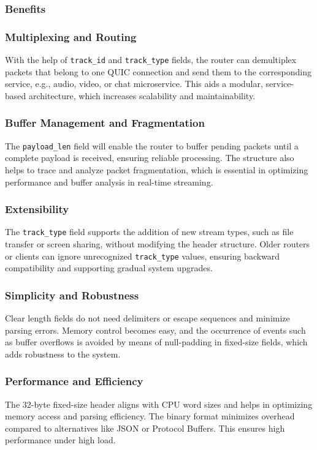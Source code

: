 \subsubsection{Benefits}

\subsubsection{Multiplexing and Routing}
With the help of \texttt{track\_id} and \texttt{track\_type} fields, the router can demultiplex packets that belong to one QUIC connection and send them to the corresponding service, e.g., audio, video, or chat microservice. This aids a modular, service-based architecture, which increases scalability and maintainability.

\subsubsection{Buffer Management and Fragmentation}
The \texttt{payload\_len} field will enable the router to buffer pending packets until a complete payload is received, ensuring reliable processing. The structure also helps to trace and analyze packet fragmentation, which is essential in optimizing performance and buffer analysis in real-time streaming.

\subsubsection{Extensibility}
The \texttt{track\_type} field supports the addition of new stream types, such as file transfer or screen sharing, without modifying the header structure. Older routers or clients can ignore unrecognized \texttt{track\_type} values, ensuring backward compatibility and supporting gradual system upgrades.

\subsubsection{Simplicity and Robustness}
Clear length fields do not need delimiters or escape sequences and minimize parsing errors. Memory control becomes easy, and the occurrence of events such as buffer overflows is avoided by means of null-padding in fixed-size fields, which adds robustness to the system.


\subsubsection{Performance and Efficiency}
The 32-byte fixed-size header aligns with CPU word sizes and helps in optimizing memory access and parsing efficiency. The binary format minimizes overhead compared to alternatives like JSON or Protocol Buffers. This ensures high performance under high load.





